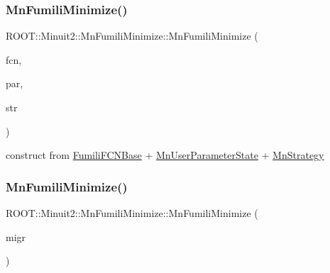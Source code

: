 \subsubsection{\texorpdfstring{MnFumiliMinimize()}{MnFumiliMinimize()}\hspace{0.1cm}{\footnotesize\ttfamily [20/21]}}
{\footnotesize\ttfamily R\+O\+O\+T\+::\+Minuit2\+::\+Mn\+Fumili\+Minimize\+::\+Mn\+Fumili\+Minimize (\begin{DoxyParamCaption}\item[{const \mbox{\hyperlink{classROOT_1_1Minuit2_1_1FumiliFCNBase}{Fumili\+F\+C\+N\+Base}} \&}]{fcn,  }\item[{const \mbox{\hyperlink{classROOT_1_1Minuit2_1_1MnUserParameterState}{Mn\+User\+Parameter\+State}} \&}]{par,  }\item[{const \mbox{\hyperlink{classROOT_1_1Minuit2_1_1MnStrategy}{Mn\+Strategy}} \&}]{str }\end{DoxyParamCaption})\hspace{0.3cm}{\ttfamily [inline]}}



construct from \mbox{\hyperlink{classROOT_1_1Minuit2_1_1FumiliFCNBase}{Fumili\+F\+C\+N\+Base}} + \mbox{\hyperlink{classROOT_1_1Minuit2_1_1MnUserParameterState}{Mn\+User\+Parameter\+State}} + \mbox{\hyperlink{classROOT_1_1Minuit2_1_1MnStrategy}{Mn\+Strategy}} 

\mbox{\label{classROOT_1_1Minuit2_1_1MnFumiliMinimize_a082eb87753b71a4d383ff8d735dc8410}} 
\subsubsection{\texorpdfstring{MnFumiliMinimize()}{MnFumiliMinimize()}\hspace{0.1cm}{\footnotesize\ttfamily [21/21]}}
{\footnotesize\ttfamily R\+O\+O\+T\+::\+Minuit2\+::\+Mn\+Fumili\+Minimize\+::\+Mn\+Fumili\+Minimize (\begin{DoxyParamCaption}\item[{const \mbox{\hyperlink{classROOT_1_1Minuit2_1_1MnFumiliMinimize}{Mn\+Fumili\+Minimize}} \&}]{migr }\end{DoxyParamCaption})\hspace{0.3cm}{\ttfamily [inline]}}

